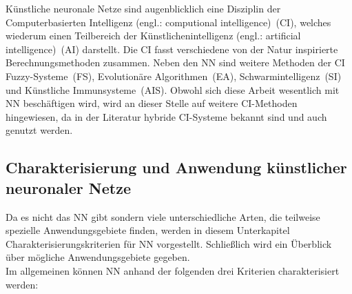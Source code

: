 
Künstliche neuronale Netze sind augenblicklich eine Disziplin der Computerbasierten Intelligenz (engl.: computional intelligence)~(CI), welches wiederum einen Teilbereich der Künstlichenintelligenz (engl.: artificial intelligence)~(AI) darstellt. Die CI fasst verschiedene von der Natur inspirierte Berechnungsmethoden zusammen. Neben den NN sind weitere Methoden der CI Fuzzy-Systeme~(FS), Evolutionäre Algorithmen~(EA), Schwarmintelligenz~(SI) und Künstliche Immunsysteme~(AIS). Obwohl sich diese Arbeit wesentlich mit NN beschäftigen wird, wird an dieser Stelle auf weitere CI-Methoden hingewiesen, da in der Literatur hybride CI-Systeme bekannt sind und auch genutzt werden.

\subsection{Charakterisierung und Anwendung künstlicher neuronaler Netze}

Da es nicht das NN gibt sondern viele unterschiedliche Arten, die teilweise spezielle Anwendungsgebiete finden, werden in diesem Unterkapitel Charakterisierungskriterien für NN vorgestellt. Schließlich wird ein Überblick über mögliche Anwendungsgebiete gegeben.\\

Im allgemeinen können NN anhand der folgenden drei Kriterien charakterisiert werden:%

